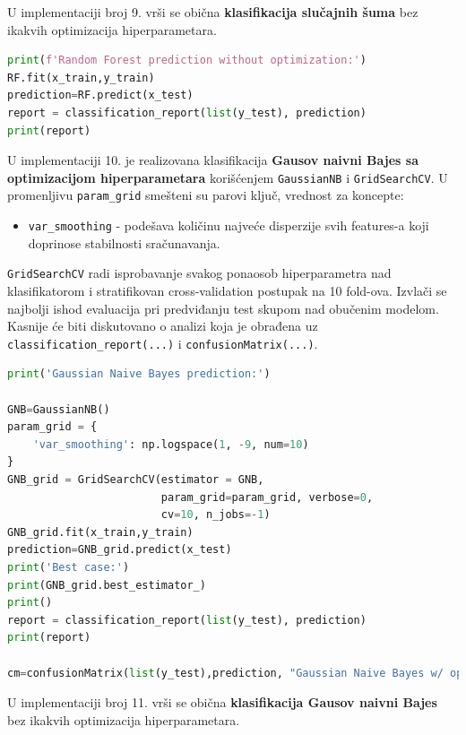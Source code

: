 \documentclass[fontsize=12bp, paper=a4]{scrarticle}
\begin{document}
U implementaciji broj 9. vrši se obična \textbf{klasifikacija slučajnih šuma} bez ikakvih optimizacija hiperparametara.

\begin{lstlisting}[language=Python, caption=Slučajne šume bez ikakvih optimizacija hiperparametara.]
print(f'Random Forest prediction without optimization:')
RF.fit(x_train,y_train)
prediction=RF.predict(x_test)
report = classification_report(list(y_test), prediction)
print(report)
\end{lstlisting}

U implementaciji 10. je realizovana klasifikacija \textbf{Gausov naivni Bajes sa optimizacijom hiperparametara} korišćenjem \verb|GaussianNB|\cite{GNB} i \verb|GridSearchCV|. U promenljivu \verb|param_grid| smešteni su parovi ključ, vrednost za koncepte:
\begin{itemize}
    \item \verb|var_smoothing| - podešava količinu najveće disperzije svih features-a koji doprinose stabilnosti sračunavanja.
\end{itemize} 
\verb*|GridSearchCV| radi isprobavanje svakog ponaosob hiperparametra nad klasifikatorom i stratifikovan cross-validation postupak na 10 fold-ova. Izvlači se najbolji ishod evaluacija pri predviđanju test skupom nad obučenim modelom. Kasnije će biti diskutovano o analizi koja je obrađena uz \verb|classification_report(...)| i \verb|confusionMatrix(...)|.
\begin{lstlisting}[language=Python, caption=Gausov naivni Bajes sa optimizacijama hiperparametara.]
print('Gaussian Naive Bayes prediction:')

GNB=GaussianNB()
param_grid = {
    'var_smoothing': np.logspace(1, -9, num=10)
}
GNB_grid = GridSearchCV(estimator = GNB,
						param_grid=param_grid, verbose=0, 											
                        cv=10, n_jobs=-1)
GNB_grid.fit(x_train,y_train)
prediction=GNB_grid.predict(x_test)
print('Best case:')
print(GNB_grid.best_estimator_)
print()
report = classification_report(list(y_test), prediction)
print(report)

cm=confusionMatrix(list(y_test),prediction, "Gaussian Naive Bayes w/ optimization")
\end{lstlisting}
U implementaciji broj 11. vrši se obična \textbf{klasifikacija Gausov naivni Bajes } bez ikakvih optimizacija hiperparametara.
\end{document}
